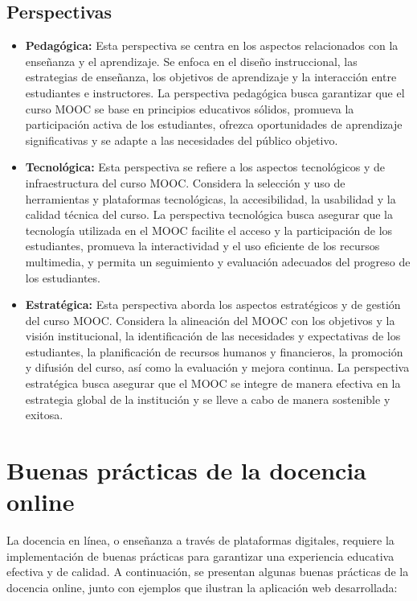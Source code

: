 \subsection{Perspectivas}
\begin{itemize}
	\item \textbf{Pedagógica:}
	Esta perspectiva se centra en los aspectos relacionados con la enseñanza y el aprendizaje. Se enfoca en el diseño instruccional, las estrategias de enseñanza, los objetivos de aprendizaje y la interacción entre estudiantes e instructores. La perspectiva pedagógica busca garantizar que el curso MOOC se base en principios educativos sólidos, promueva la participación activa de los estudiantes, ofrezca oportunidades de aprendizaje significativas y se adapte a las necesidades del público objetivo.
	\item \textbf{Tecnológica:}
	Esta perspectiva se refiere a los aspectos tecnológicos y de infraestructura del curso MOOC. Considera la selección y uso de herramientas y plataformas tecnológicas, la accesibilidad, la usabilidad y la calidad técnica del curso. La perspectiva tecnológica busca asegurar que la tecnología utilizada en el MOOC facilite el acceso y la participación de los estudiantes, promueva la interactividad y el uso eficiente de los recursos multimedia, y permita un seguimiento y evaluación adecuados del progreso de los estudiantes.
	\item \textbf{Estratégica:}
	Esta perspectiva aborda los aspectos estratégicos y de gestión del curso MOOC. Considera la alineación del MOOC con los objetivos y la visión institucional, la identificación de las necesidades y expectativas de los estudiantes, la planificación de recursos humanos y financieros, la promoción y difusión del curso, así como la evaluación y mejora continua. La perspectiva estratégica busca asegurar que el MOOC se integre de manera efectiva en la estrategia global de la institución y se lleve a cabo de manera sostenible y exitosa.
\end{itemize}

\section{Buenas prácticas de la docencia online}
La docencia en línea, o enseñanza a través de plataformas digitales, requiere la implementación de buenas prácticas para garantizar una experiencia educativa efectiva y de calidad. A continuación, se presentan algunas buenas prácticas de la docencia online, junto con ejemplos que ilustran la aplicación web desarrollada:


